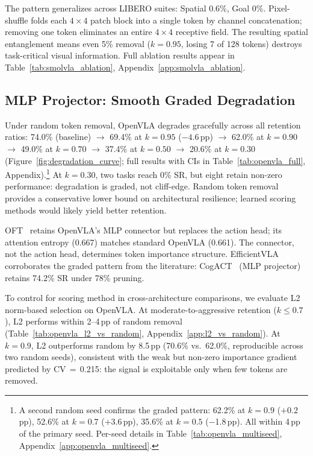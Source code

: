 The pattern generalizes across LIBERO suites: Spatial 0.6\%, Goal 0\%. Pixel-shuffle folds each $4{\times}4$ patch block into a single token by channel concatenation; removing one token eliminates an entire $4{\times}4$ receptive field. The resulting spatial entanglement means even 5\% removal ($k{=}0.95$, losing 7 of 128 tokens) destroys task-critical visual information. Full ablation results appear in Table~\ref{tab:smolvla_ablation}, Appendix~\ref{app:smolvla_ablation}.

\subsection{MLP Projector: Smooth Graded Degradation}
\label{sec:openvla_results}

Under random token removal, OpenVLA degrades gracefully across all retention ratios: 74.0\% (baseline) $\rightarrow$ 69.4\% at $k{=}0.95$ ($-4.6$\,pp) $\rightarrow$ 62.0\% at $k{=}0.90$ $\rightarrow$ 49.0\% at $k{=}0.70$ $\rightarrow$ 37.4\% at $k{=}0.50$ $\rightarrow$ 20.6\% at $k{=}0.30$ (Figure~\ref{fig:degradation_curve}; full results with CIs in Table~\ref{tab:openvla_full}, Appendix).\footnote{A second random seed confirms the graded pattern: 62.2\% at $k{=}0.9$ ($+$0.2\,pp), 52.6\% at $k{=}0.7$ ($+$3.6\,pp), 35.6\% at $k{=}0.5$ ($-$1.8\,pp). All within 4\,pp of the primary seed. Per-seed details in Table~\ref{tab:openvla_multiseed}, Appendix~\ref{app:openvla_multiseed}.} At $k{=}0.30$, two tasks reach 0\% SR, but eight retain non-zero performance: degradation is graded, not cliff-edge. Random token removal provides a conservative lower bound on architectural resilience; learned scoring methods would likely yield better retention.

OFT~\cite{kim2025openoft} retains OpenVLA's MLP connector but replaces the action head; its attention entropy (0.667) matches standard OpenVLA (0.661). The connector, not the action head, determines token importance structure. EfficientVLA~\cite{yang2025efficientvla} corroborates the graded pattern from the literature: CogACT~\cite{li2024cogact} (MLP projector) retains 74.2\% SR under 78\% pruning.

To control for scoring method in cross-architecture comparisons, we evaluate L2 norm-based selection on OpenVLA. At moderate-to-aggressive retention ($k \leq 0.7$), L2 performs within 2--4\,pp of random removal (Table~\ref{tab:openvla_l2_vs_random}, Appendix~\ref{app:l2_vs_random}). At $k{=}0.9$, L2 outperforms random by 8.5\,pp (70.6\% vs.\ 62.0\%, reproducible across two random seeds), consistent with the weak but non-zero importance gradient predicted by CV$\,{=}\,$0.215: the signal is exploitable only when few tokens are removed.

